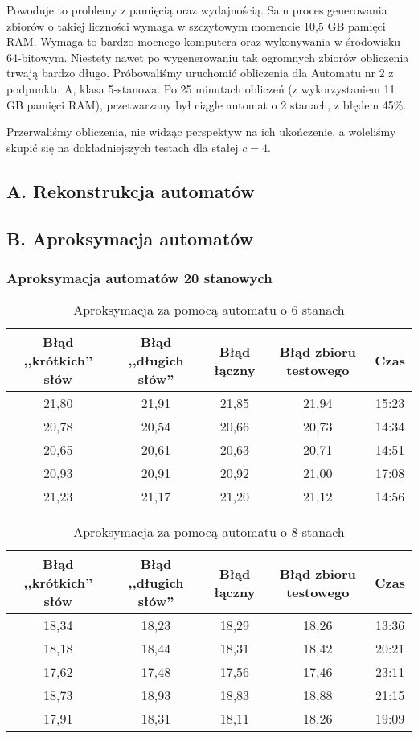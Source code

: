 \documentclass{../llncs_template_final/llncs}
\begin{document}
Powoduje to problemy z pamięcią oraz wydajnością. Sam proces generowania zbiorów o takiej liczności wymaga w szczytowym momencie 10,5 GB pamięci RAM. Wymaga to bardzo mocnego komputera oraz wykonywania w środowisku 64-bitowym.
Niestety nawet po wygenerowaniu tak ogromnych zbiorów obliczenia trwają bardzo długo. Próbowaliśmy uruchomić obliczenia dla Automatu nr 2 z podpunktu A, klasa 5-stanowa. Po 25 minutach obliczeń (z wykorzystaniem 11 GB pamięci RAM), przetwarzany był ciągle automat o 2 stanach, z błędem 45\%. 

Przerwaliśmy obliczenia, nie widząc perspektyw na ich ukończenie, a woleliśmy skupić się na dokładniejszych testach dla stałej $c = 4$.

\subsection{A. Rekonstrukcja automatów}

\newpage

\subsection{B. Aproksymacja automatów} 

\subsubsection{Aproksymacja automatów 20 stanowych} 

\begin{table}[] 
\centering 
\caption{Aproksymacja za pomocą automatu o 6 stanach}  
\begin{tabular}{| c | c | c | c | c |} 
\hline Błąd ,,krótkich'' słów & Błąd ,,długich słów'' & Błąd łączny & Błąd zbioru testowego & Czas \\ [0.5ex] 
\hline 21,80 & 21,91 & 21,85 & 21,94 & 15:23 \\ 
\hline 20,78 & 20,54 & 20,66 & 20,73 & 14:34 \\ 
\hline 20,65 & 20,61 & 20,63 & 20,71 & 14:51 \\ 
\hline 20,93 & 20,91 & 20,92 & 21,00 & 17:08 \\ 
\hline 21,23 & 21,17 & 21,20 & 21,12 & 14:56 \\ 
\hline 
\end{tabular} 
\end{table} 

\begin{table}[] 
\centering 
\caption{Aproksymacja za pomocą automatu o 8 stanach} 
\begin{tabular}{| c | c | c | c | c |} 
\hline Błąd ,,krótkich'' słów & Błąd ,,długich słów'' & Błąd łączny & Błąd zbioru testowego & Czas \\ [0.5ex] 
\hline 18,34 & 18,23 & 18,29 & 18,26 & 13:36 \\ 
\hline 18,18 & 18,44 & 18,31 & 18,42 & 20:21 \\ 
\hline 17,62 & 17,48 & 17,56 & 17,46 & 23:11 \\ 
\hline 18,73 & 18,93 & 18,83 & 18,88 & 21:15 \\ 
\hline 17,91 & 18,31 & 18,11 & 18,26 & 19:09 \\ 
\hline 
\end{tabular} 
\end{table}
\end{document}
